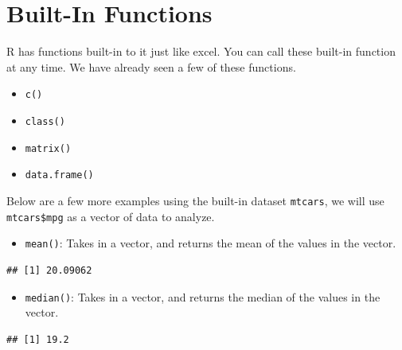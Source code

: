 \documentclass[
]{book}
\newenvironment{Shaded}{\begin{snugshade}}{\end{snugshade}}
\newcommand{\KeywordTok}[1]{\textcolor[rgb]{0.13,0.29,0.53}{\textbf{#1}}}
\newcommand{\NormalTok}[1]{#1}
\newcommand{\OperatorTok}[1]{\textcolor[rgb]{0.81,0.36,0.00}{\textbf{#1}}}
\providecommand{\tightlist}{%
  \setlength{\itemsep}{0pt}\setlength{\parskip}{0pt}}
\begin{document}
\hypertarget{built-in-functions}{%
\section{Built-In Functions}\label{built-in-functions}}

R has functions built-in to it just like excel. You can call these built-in function at any time. We have already seen a few of these functions.

\begin{itemize}
\tightlist
\item
  \texttt{c()}
\item
  \texttt{class()}
\item
  \texttt{matrix()}
\item
  \texttt{data.frame()}
\end{itemize}

Below are a few more examples using the built-in dataset \texttt{mtcars}, we will use \texttt{mtcars\$mpg} as a vector of data to analyze.

\begin{itemize}
\tightlist
\item
  \texttt{mean()}: Takes in a vector, and returns the mean of the values in the vector.
\end{itemize}

\begin{Shaded}
\end{Shaded}

\begin{verbatim}
## [1] 20.09062
\end{verbatim}

\begin{itemize}
\tightlist
\item
  \texttt{median()}: Takes in a vector, and returns the median of the values in the vector.
\end{itemize}

\begin{Shaded}
\end{Shaded}

\begin{verbatim}
## [1] 19.2
\end{verbatim}
\end{document}
